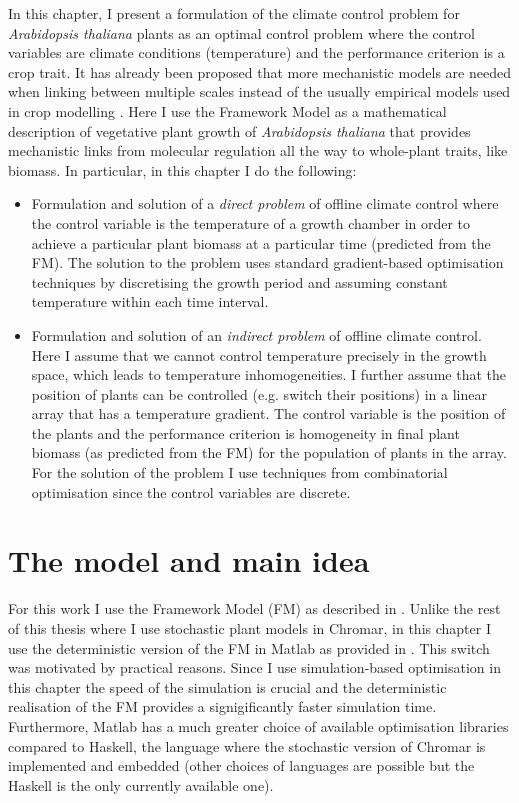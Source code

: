 In this chapter, I present a formulation of the climate control problem for
\textit{Arabidopsis thaliana} plants as an optimal control problem
\citep{kirk_optimal_2012} where the control variables are climate conditions
(temperature) and the performance criterion is a crop trait. It has already been
proposed that more mechanistic models are needed when linking between multiple
scales instead of the usually empirical models used in crop modelling
\citep{yin_role_2004, yin_modelling_2010}. Here I use the Framework Model
\citep[FMv1;][]{chew2014multiscale} as a mathematical description of vegetative
plant growth of \textit{Arabidopsis thaliana} that provides mechanistic links
from molecular regulation all the way to whole-plant traits, like biomass. In
particular, in this chapter I do the following:
\begin{itemize}
\item Formulation and solution of a \textit{direct problem} of offline climate
  control where the control variable is the temperature of a growth chamber in
  order to achieve a particular plant biomass at a particular time (predicted
  from the FM). The solution to the problem uses standard gradient-based
  optimisation techniques by discretising the growth period and assuming
  constant temperature within each time interval.
\item Formulation and solution of an \textit{indirect problem} of offline
  climate control. Here I assume that we cannot control temperature precisely in
  the growth space, which leads to temperature inhomogeneities. I further assume
  that the position of plants can be controlled (e.g. switch their positions) in
  a linear array that has a temperature gradient. The control variable is the
  position of the plants and the performance criterion is homogeneity in final
  plant biomass (as predicted from the FM) for the population of plants in the
  array. For the solution of the problem I use techniques from combinatorial
  optimisation since the control variables are discrete.
\end{itemize}

\section{The model and main idea}
For this work I use the Framework Model (FM) as described in
\citet{chew2014multiscale}. Unlike the rest of this thesis where I use
stochastic plant models in Chromar, in this chapter I use the deterministic
version of the FM in Matlab as provided in \citet{chew2014multiscale}. This
switch was motivated by practical reasons. Since I use simulation-based
optimisation in this chapter the speed of the simulation is crucial and the
deterministic realisation of the FM provides a signigificantly faster simulation
time. Furthermore, Matlab has a much greater choice of available optimisation
libraries compared to Haskell, the language where the stochastic version of
Chromar is implemented and embedded (other choices of languages are possible but
the Haskell is the only currently available one).

